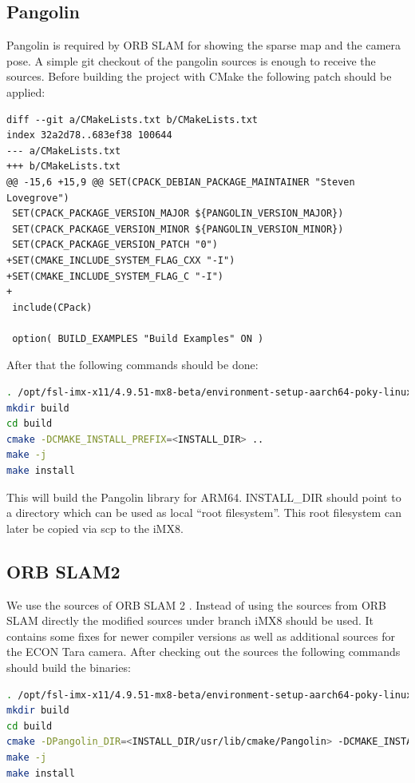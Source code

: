 \documentclass[11pt,a4paper,titlepage,oneside]{report}
\begin{document}
\subsection{Pangolin}
Pangolin \cite{pangolin} is required by ORB SLAM for showing the sparse map and the camera pose. A simple git checkout of the pangolin sources is enough to receive the sources. Before building the project with CMake the following patch should be applied:
\begin{lstlisting}
diff --git a/CMakeLists.txt b/CMakeLists.txt
index 32a2d78..683ef38 100644
--- a/CMakeLists.txt
+++ b/CMakeLists.txt
@@ -15,6 +15,9 @@ SET(CPACK_DEBIAN_PACKAGE_MAINTAINER "Steven Lovegrove")
 SET(CPACK_PACKAGE_VERSION_MAJOR ${PANGOLIN_VERSION_MAJOR})
 SET(CPACK_PACKAGE_VERSION_MINOR ${PANGOLIN_VERSION_MINOR})
 SET(CPACK_PACKAGE_VERSION_PATCH "0")
+SET(CMAKE_INCLUDE_SYSTEM_FLAG_CXX "-I")
+SET(CMAKE_INCLUDE_SYSTEM_FLAG_C "-I")
+
 include(CPack)
 
 option( BUILD_EXAMPLES "Build Examples" ON )
\end{lstlisting}

After that the following commands should be done:
\begin{lstlisting}[language=bash]
. /opt/fsl-imx-x11/4.9.51-mx8-beta/environment-setup-aarch64-poky-linux
mkdir build
cd build
cmake -DCMAKE_INSTALL_PREFIX=<INSTALL_DIR> ..
make -j
make install
\end{lstlisting}

This will build the Pangolin library for ARM64. INSTALL\_DIR should point to a directory which can be used as local ``root filesystem''. This root filesystem can later be copied via scp to the iMX8.

\subsection{ORB SLAM2}
We use the sources of ORB SLAM 2 \cite{orbslam2_impl}. Instead of using the sources from ORB SLAM directly the modified sources \cite{orbslam2_se} under branch iMX8 should be used. It contains some fixes for newer compiler versions as well as additional sources for the ECON Tara camera. After checking out the sources the following commands should build the binaries:\\
\begin{lstlisting}[language=bash]
. /opt/fsl-imx-x11/4.9.51-mx8-beta/environment-setup-aarch64-poky-linux
mkdir build
cd build
cmake -DPangolin_DIR=<INSTALL_DIR/usr/lib/cmake/Pangolin> -DCMAKE_INSTALL_PREFIX=<INSTALL_DIR> ..
make -j
make install
\end{lstlisting}
\end{document}
